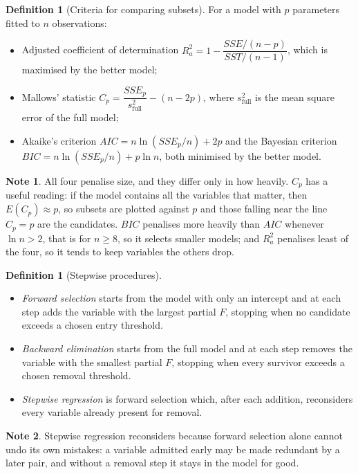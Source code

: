 \documentclass[11pt,a4paper]{article}
\theoremstyle{definition}
\newtheorem{defn}[thm]{Definition}
\newtheorem*{note}{Note}
\begin{document}
\begin{defn}[Criteria for comparing subsets]
For a model with $p$ parameters fitted to $n$ observations:
\begin{itemize}
\item Adjusted coefficient of determination
$R^2_a=1-\dfrac{SSE/(n-p)}{SST/(n-1)}$, which is maximised by the better
model;
\item Mallows' statistic
$C_p=\dfrac{SSE_p}{s^{2}_{\text{full}}}-\left(n-2p\right)$, where
$s^2_{\text{full}}$ is the mean square error of the full model;
\item Akaike's criterion $AIC=n\ln\left(SSE_p/n\right)+2p$ and the Bayesian
criterion $BIC=n\ln\left(SSE_p/n\right)+p\ln n$, both minimised by the better
model.
\end{itemize}
\end{defn}

\begin{note}
All four penalise size, and they differ only in how heavily. $C_p$ has a
useful reading: if the model contains all the variables that matter, then
$E\left(C_p\right)\approx p$, so subsets are plotted against $p$ and those
falling near the line $C_p=p$ are the candidates. $BIC$ penalises more heavily
than $AIC$ whenever $\ln n>2$, that is for $n\geq8$, so it selects smaller
models; and $R^2_a$ penalises least of the four, so it tends to keep variables
the others drop.
\end{note}

\begin{defn}[Stepwise procedures]
\begin{itemize}
\item \emph{Forward selection} starts from the model with only an intercept
and at each step adds the variable with the largest partial $F$, stopping when
no candidate exceeds a chosen entry threshold.
\item \emph{Backward elimination} starts from the full model and at each step
removes the variable with the smallest partial $F$, stopping when every
survivor exceeds a chosen removal threshold.
\item \emph{Stepwise regression} is forward selection which, after each
addition, reconsiders every variable already present for removal.
\end{itemize}
\end{defn}

\begin{note}
Stepwise regression reconsiders because forward selection alone cannot undo
its own mistakes: a variable admitted early may be made redundant by a later
pair, and without a removal step it stays in the model for good.
\end{note}
\end{document}
